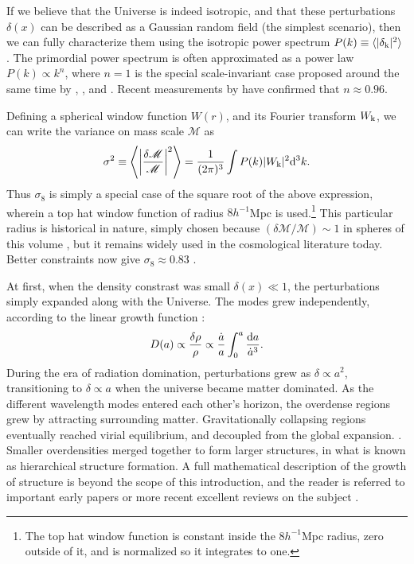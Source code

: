 If we believe that the Universe is indeed isotropic, and that these perturbations $\delta(x)$ can be described as a Gaussian random field (the simplest scenario), then we can fully characterize them using the isotropic power spectrum $P(k) \equiv \langle | \delta_{\rm k} |^2 \rangle$ \citep{PeeblesText,Kravtsov12}. The primordial power spectrum is often approximated as a power law $P(k) \propto k^n$, where $n=1$ is the special scale-invariant case proposed around the same time by \citet{Harrison70}, \citet{PeeblesYu70}, and \citet{Zeldovich72}. Recent measurements by \citet{PlanckXVI} have confirmed that $n \approx 0.96$.

Defining a spherical window function $W(r)$, and its Fourier transform $W_{\rm k}$, we can write the variance on mass scale ${\mathscr M}$ as 
\begin{equation}
\sigma^2 \equiv \left\langle \left| \frac{\delta {\mathscr M}}{\mathscr M} \right|^2 \right\rangle = \frac{1}{(2\pi)^3} \int P(k) |W_{\rm k}|^2 {\rm d}^3k.
\end{equation}
Thus $\sigma_8$ is simply a special case of the square root of the above expression, wherein a top hat window function of radius $8 h^{-1}$Mpc is used.\footnote{The top hat window function is constant inside the $8 h^{-1}$Mpc radius, zero outside of it, and is normalized so it integrates to one.} This particular radius is historical in nature, simply chosen because $(\delta {\mathscr M}/{\mathscr M}) \sim 1$ in spheres of this volume \citep{DavisPeebles83}, but it remains widely used in the cosmological literature today. Better constraints now give $\sigma_8 \approx 0.83$ \citep{PlanckXVI}.

At first, when the density constrast was small $\delta(x) \ll 1$, the perturbations simply expanded along with the Universe. The modes grew independently, according to the linear growth function \citep{PeeblesText,Voit05}:
\begin{equation}
D(a) \propto \frac{\delta \rho}{\rho} \propto \frac{\dot{a}}{a} \int_0^a \frac{{\rm d}a}{\dot{a}^3}.
\end{equation}
During the era of radiation domination, perturbations grew as $\delta \propto a^2$, transitioning to $\delta \propto a$ when the universe became matter dominated. As the different wavelength modes entered each other's horizon, the overdense regions grew by attracting surrounding matter. Gravitationally collapsing regions eventually reached virial equilibrium, and decoupled from the global expansion. \citep{Schneider06_IntroGravLensCosmology}. Smaller overdensities merged together to form larger structures, in what is known as hierarchical structure formation. A full mathematical description of the growth of structure is beyond the scope of this introduction,  and the reader is referred to important early papers \citep[e.g.][]{PS74,GottRees75} or more recent excellent reviews on the subject \citep[e.g.][]{Voit05,Schneider06_IntroGravLensCosmology,Kravtsov12}. 

